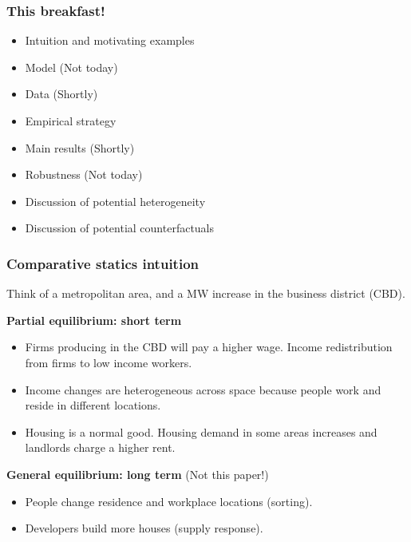 \documentclass[aspectratio=169]{beamer}
\begin{document}
\begin{frame}
	\frametitle{This breakfast!}
	
	\begin{itemize}
		\vspace{.5mm} \item Intuition and motivating examples
                 \vspace{.5mm} \item Model (Not today)	
		\vspace{.5mm} \item Data (Shortly)
		\vspace{.5mm} \item 	Empirical strategy
		\vspace{.5mm} \item Main results (Shortly)
		\vspace{.5mm} \item Robustness (Not today)
		\vspace{.5mm} \item Discussion of potential heterogeneity
		\vspace{.5mm} \item Discussion of potential counterfactuals
	\end{itemize}
\end{frame}

\begin{frame}
	\frametitle{Comparative statics intuition}
    
    \vspace{3mm}
    
	Think of a metropolitan area, and a MW increase in the business district (CBD). 
	
	\vspace{3mm}
	
    \textbf{Partial equilibrium: short term}
	\begin{itemize}
		\vspace{.5mm} \item Firms producing in the CBD will pay a higher wage. Income redistribution 
		from firms to low income workers.
		\vspace{.5mm} \item Income changes are heterogeneous across space because people work 
		and reside in different locations.
		\vspace{.5mm} \item Housing is a normal good. Housing demand in some areas increases 
		and landlords charge a higher rent.
	\end{itemize}

	\pause
	\vspace{3mm}
	\textbf{General equilibrium: long term} (Not this paper!)
	\begin{itemize}
	\vspace{.5mm} \item People change residence and workplace locations (sorting).
	\vspace{.5mm} \item Developers build more houses (supply response).
\end{itemize}
\end{frame}
\end{document}
